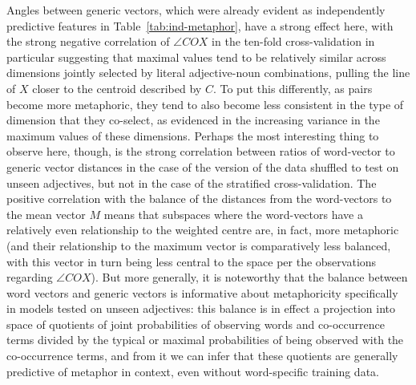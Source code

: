 Angles between generic vectors, which were already evident as independently predictive features in Table~\ref{tab:ind-metaphor}, have a strong effect here, with the strong negative correlation of $\angle COX$ in the ten-fold cross-validation in particular suggesting that maximal values tend to be relatively similar across dimensions jointly selected by literal adjective-noun combinations, pulling the line of $X$ closer to the centroid described by $C$.  To put this differently, as pairs become more metaphoric, they tend to also become less consistent in the type of dimension that they co-select, as evidenced in the increasing variance in the maximum values of these dimensions.  Perhaps the most interesting thing to observe here, though, is the strong correlation between ratios of word-vector to generic vector distances in the case of the version of the data shuffled to test on unseen adjectives, but not in the case of the stratified cross-validation.  The positive correlation with the balance of the distances from the word-vectors to the mean vector $M$ means that subspaces where the word-vectors have a relatively even relationship to the weighted centre are, in fact, more metaphoric (and their relationship to the maximum vector is comparatively less balanced, with this vector in turn being less central to the space per the observations regarding $\angle COX$).  But more generally, it is noteworthy that the balance between word vectors and generic vectors is informative about metaphoricity specifically in models tested on unseen adjectives: this balance is in effect a projection into space of quotients of joint probabilities of observing words and co-occurrence terms divided by the typical or maximal probabilities of being observed with the co-occurrence terms, and from it we can infer that these quotients are generally predictive of metaphor in context, even without word-specific training data.


